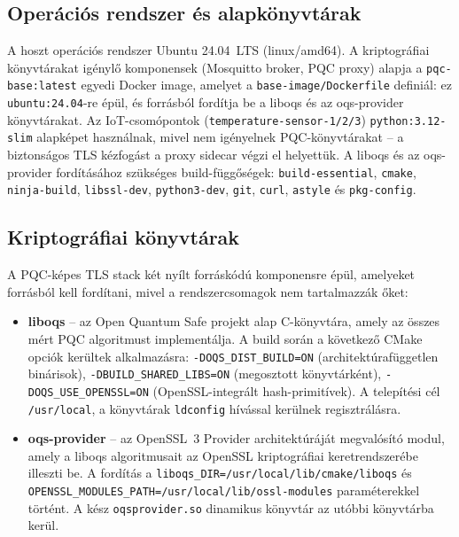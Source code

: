 \subsection{Operációs rendszer és alapkönyvtárak}

A hoszt operációs rendszer Ubuntu 24.04~LTS (linux/amd64). A kriptográfiai könyvtárakat igénylő
komponensek (Mosquitto broker, PQC proxy) alapja a \texttt{pqc-base:latest} egyedi Docker image,
amelyet a \texttt{base-image/Dockerfile} definiál: ez \texttt{ubuntu:24.04}-re épül, és
forrásból fordítja be a liboqs és az oqs-provider könyvtárakat. Az IoT-csomópontok
(\texttt{temperature-sensor-1/2/3}) \texttt{python:3.12-slim} alapképet használnak, mivel nem
igényelnek PQC-könyvtárakat -- a biztonságos TLS kézfogást a proxy sidecar végzi el helyettük.
A liboqs és az oqs-provider fordításához szükséges build-függőségek: \texttt{build-essential},
\texttt{cmake}, \texttt{ninja-build}, \texttt{libssl-dev}, \texttt{python3-dev}, \texttt{git},
\texttt{curl}, \texttt{astyle} és \texttt{pkg-config}.

\subsection{Kriptográfiai könyvtárak}

A PQC-képes TLS stack két nyílt forráskódú komponensre épül, amelyeket forrásból kell fordítani,
mivel a rendszercsomagok nem tartalmazzák őket:

\begin{itemize}
    \item \textbf{liboqs} -- az Open Quantum Safe projekt alap C-könyvtára, amely az összes
          mért PQC algoritmust implementálja. A build során a következő CMake opciók kerültek
          alkalmazásra: \texttt{-DOQS\_DIST\_BUILD=ON} (architektúrafüggetlen binárisok),
          \texttt{-DBUILD\_SHARED\_LIBS=ON} (megosztott könyvtárként), \texttt{-DOQS\_USE\_OPENSSL=ON}
          (OpenSSL-integrált hash-primitívek). A telepítési cél \texttt{/usr/local}, a könyvtárak
          \texttt{ldconfig} hívással kerülnek regisztrálásra.
    \item \textbf{oqs-provider} -- az OpenSSL~3 Provider architektúráját megvalósító modul,
          amely a liboqs algoritmusait az OpenSSL kriptográfiai keretrendszerébe illeszti be.
          A fordítás a \texttt{liboqs\_DIR=/usr/local/lib/cmake/liboqs} és
          \texttt{OPENSSL\_MODULES\_PATH=/usr/local/lib/ossl-modules} paraméterekkel történt.
          A kész \texttt{oqsprovider.so} dinamikus könyvtár az utóbbi könyvtárba kerül.
\end{itemize}

